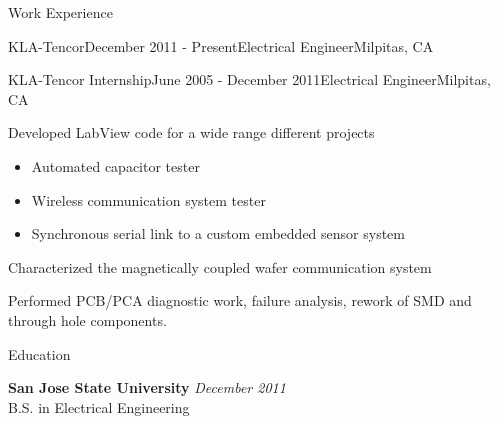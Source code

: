\documentclass{resume} %
\begin{document}
\begin{rSection}{Work Experience}
\begin{rSubsection}{KLA-Tencor}{December 2011 - Present}{Electrical Engineer}{Milpitas, CA}
\end{rSubsection}


\begin{rSubsection}{KLA-Tencor Internship}{June 2005 - December 2011}{Electrical Engineer}{Milpitas, CA}
\item Developed LabView code for a wide range different projects
\begin{itemize}
\itemsep -0.5em \vspace{-0.5em}
\renewcommand{\labelitemi}{-}
\item Automated capacitor tester
\item Wireless communication system tester
\item Synchronous serial link to a custom embedded sensor system
\end{itemize}
\item Characterized the magnetically coupled wafer communication system
\item Performed PCB/PCA diagnostic work, failure analysis, rework of SMD and through hole components.
\end{rSubsection}

\end{rSection}


\begin{rSection}{Education}

{\bf San Jose State University} \hfill {\em December 2011} \\ 
B.S. in Electrical Engineering \\

\end{rSection}





\end{document}
